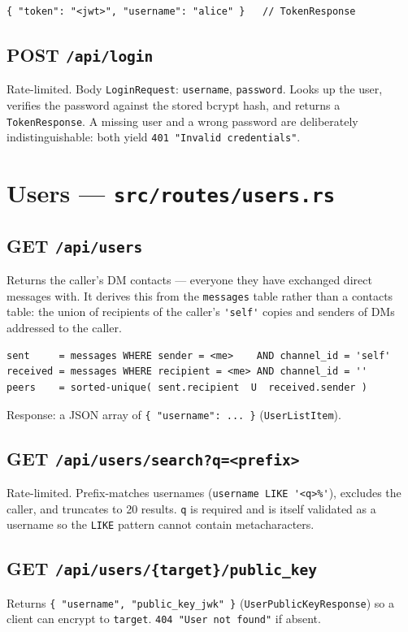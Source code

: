 \begin{lstlisting}
{ "token": "<jwt>", "username": "alice" }   // TokenResponse
\end{lstlisting}

\subsection*{POST \texttt{/api/login}}
Rate-limited. Body \verb|LoginRequest|: \verb|username|, \verb|password|. Looks up
the user, verifies the password against the stored bcrypt hash, and returns a
\verb|TokenResponse|. A missing user and a wrong password are deliberately
indistinguishable: both yield \verb|401 "Invalid credentials"|.

\section{Users --- \texttt{src/routes/users.rs}}

\subsection*{GET \texttt{/api/users}}
Returns the caller's DM contacts --- everyone they have exchanged direct messages
with. It derives this from the \verb|messages| table rather than a contacts
table: the union of recipients of the caller's \verb|'self'| copies and senders
of DMs addressed to the caller.

\begin{lstlisting}
sent     = messages WHERE sender = <me>    AND channel_id = 'self'
received = messages WHERE recipient = <me> AND channel_id = ''
peers    = sorted-unique( sent.recipient  U  received.sender )
\end{lstlisting}

Response: a JSON array of \verb|{ "username": ... }| (\verb|UserListItem|).

\subsection*{GET \texttt{/api/users/search?q=<prefix>}}
Rate-limited. Prefix-matches usernames (\verb|username LIKE '<q>%'|), excludes the
caller, and truncates to 20 results. \verb|q| is required and is itself validated
as a username so the \verb|LIKE| pattern cannot contain metacharacters.

\subsection*{GET \texttt{/api/users/\{target\}/public\_key}}
Returns \verb|{ "username", "public_key_jwk" }| (\verb|UserPublicKeyResponse|) so
a client can encrypt to \verb|target|. \verb|404 "User not found"| if absent.


